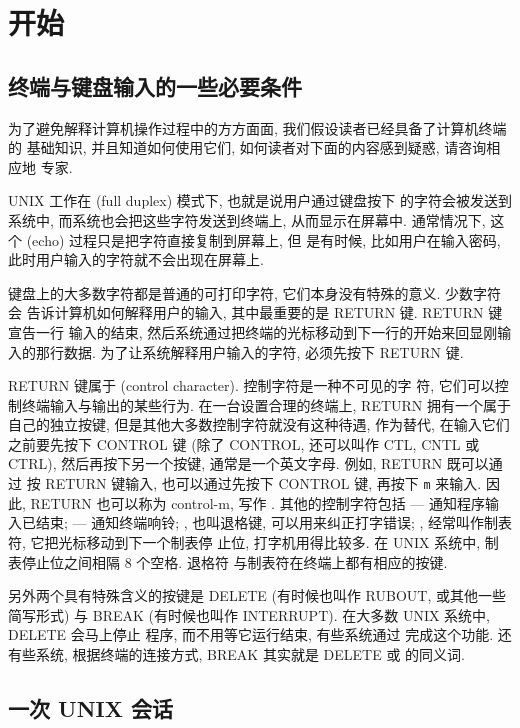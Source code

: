 \section{开始}
\label{sec:getting_started}

\subsection{终端与键盘输入的一些必要条件}
\label{subsec:some_prerequisites_about_terminals_and_typing}

为了避免解释计算机操作过程中的方方面面, 我们假设读者已经具备了计算机终端的
基础知识, 并且知道如何使用它们, 如何读者对下面的内容感到疑惑, 请咨询相应地
专家.

UNIX 工作在  (full duplex) 模式下, 也就是说用户通过键盘按下
的字符会被发送到系统中, 而系统也会把这些字符发送到终端上, 从而显示在屏幕中.
通常情况下, 这个  (echo) 过程只是把字符直接复制到屏幕上, 但
是有时候, 比如用户在输入密码, 此时用户输入的字符就不会出现在屏幕上.

键盘上的大多数字符都是普通的可打印字符, 它们本身没有特殊的意义. 少数字符会
告诉计算机如何解释用户的输入, 其中最重要的是 RETURN 键. RETURN 键宣告一行
输入的结束, 然后系统通过把终端的光标移动到下一行的开始来回显刚输入的那行数据.
为了让系统解释用户输入的字符, 必须先按下 RETURN 键.

RETURN 键属于  (control character). 控制字符是一种不可见的字
符, 它们可以控制终端输入与输出的某些行为. 在一台设置合理的终端上, RETURN
拥有一个属于自己的独立按键, 但是其他大多数控制字符就没有这种待遇, 作为替代,
在输入它们之前要先按下 CONTROL 键 (除了 CONTROL, 还可以叫作 CTL,
CNTL 或 CTRL), 然后再按下另一个按键, 通常是一个英文字母. 例如, RETURN 既可以通过
按 RETURN 键输入, 也可以通过先按下 CONTROL 键, 再按下 \texttt{m} 来输入. 因此,
RETURN
也可以称为 control-m, 写作 . 其他的控制字符包括  ---
通知程序输入已结束;  --- 通知终端响铃; , 也叫退格键,
可以用来纠正打字错误; , 经常叫作制表符, 它把光标移动到下一个制表停
止位, 打字机用得比较多. 在 UNIX 系统中, 制表停止位之间相隔 8 个空格. 退格符
与制表符在终端上都有相应的按键.

另外两个具有特殊含义的按键是 DELETE (有时候也叫作 RUBOUT, 或其他一些简写形式)
与 BREAK (有时候也叫作 INTERRUPT). 在大多数 UNIX 系统中, DELETE 会马上停止
程序, 而不用等它运行结束, 有些系统通过  完成这个功能. 还有些系统,
根据终端的连接方式, BREAK 其实就是 DELETE 或  的同义词.

\subsection{一次 UNIX 会话}
\label{subsec:a_session_with_unix}

